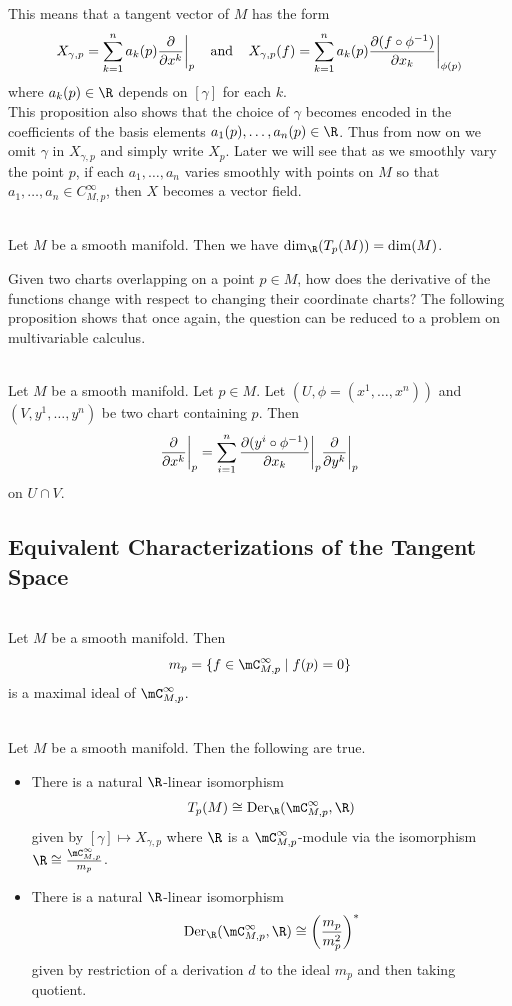 \documentclass[a4paper]{article}
\begin{document}
This means that a tangent vector of $M$ has the form $$X_{\gamma,p}=\sum_{k=1}^na_k(p)\frac{\partial}{\partial x^k}\bigg{|}_p\;\;\;\;\text{and}\;\;\;\;X_{\gamma,p}(f)=\sum_{k=1}^na_k(p)\frac{\partial (f\circ\phi^{-1})}{\partial x_k}\bigg{|}_{\phi(p)}$$ where $a_k(p)\in\R$ depends on $[\gamma]$ for each $k$. \\

This proposition also shows that the choice of $\gamma$ becomes encoded in the coefficients of the basis elements $a_1(p),\dots,a_n(p)\in\R$. Thus from now on we omit $\gamma$ in $X_{\gamma,p}$ and simply write $X_p$. Later we will see that as we smoothly vary the point $p$, if each $a_1,\dots,a_n$ varies smoothly with points on $M$ so that $a_1,\dots,a_n\in C_{M,p}^\infty$, then $X$ becomes a vector field. \\

\begin{crl}{}{}\\
Let $M$ be a smooth manifold. Then we have $\dim_\R(T_p(M))=\dim(M)$. 
\end{crl}

Given two charts overlapping on a point $p\in M$, how does the derivative of the functions change with respect to changing their coordinate charts? The following proposition shows that once again, the question can be reduced to a problem on multivariable calculus. 

\begin{prp}{}{}\\
Let $M$ be a smooth manifold. Let $p\in M$. Let $(U,\phi=(x^1,\dots,x^n))$ and $(V,y^1,\dots,y^n)$ be two chart containing $p$. Then $$\frac{\partial}{\partial x^k}\bigg{|}_p=\sum_{i=1}^n\frac{\partial(y^i\circ\phi^{-1})}{\partial x_k}\bigg{|}_p\frac{\partial}{\partial y^k}\bigg{|}_p$$ on $U\cap V$. 
\end{prp}

\subsection{Equivalent Characterizations of the Tangent Space}
\begin{lmm}{}{}\\
Let $M$ be a smooth manifold. Then $$m_p=\{f\in\mC_{M,p}^\infty\;|\;f(p)=0\}$$ is a maximal ideal of $\mC_{M,p}^\infty$. 
\end{lmm}

\begin{prp}{}{}\\
Let $M$ be a smooth manifold. Then the following are true. 
\begin{itemize}
\item There is a natural $\R$-linear isomorphism $$T_p(M)\cong\text{Der}_\R(\mC_{M,p}^\infty,\R)$$ given by $[\gamma]\mapsto X_{\gamma,p}$ where $\R$ is a $\mC_{M,p}^\infty$-module via the isomorphism $\R\cong\frac{\mC_{M,p}^\infty}{m_p}$. 
\item There is a natural $\R$-linear isomorphism $$\text{Der}_\R(\mC_{M,p}^\infty,\R)\cong\left(\frac{m_p}{m_p^2}\right)^\ast$$ given by restriction of a derivation $d$ to the ideal $m_p$ and then taking quotient. 
\end{itemize}
\end{prp}
\end{document}
